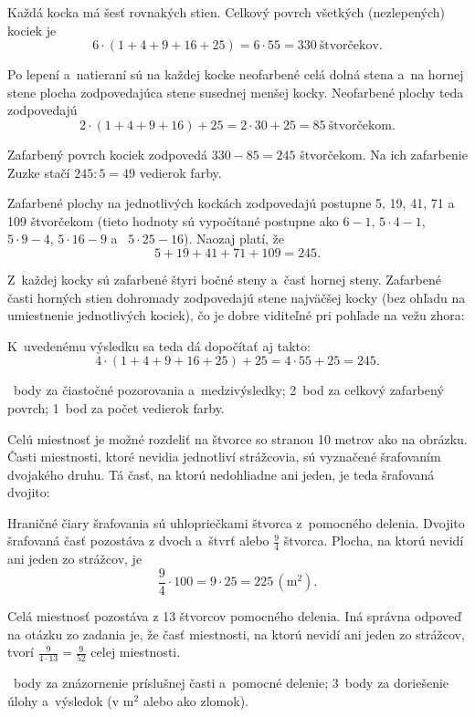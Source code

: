 {%
Každá kocka má šesť rovnakých stien.
Celkový povrch všetkých (nezlepených) kociek je
$$
6\cdot(1+4+9+16+25) =6\cdot55 = 330\ \text{štvorčekov}.
$$

Po lepení a~natieraní sú na každej kocke neofarbené celá dolná stena a~na hornej stene plocha zodpovedajúca stene susednej menšej kocky.
Neofarbené plochy teda zodpovedajú
$$
2\cdot(1+4+9+16)+25 =2\cdot30+25 = 85\ \text{štvorčekom}.
$$

Zafarbený povrch kociek zodpovedá $330-85=245$ štvorčekom.
Na ich zafarbenie Zuzke stačí $245:5=49$ vedierok farby.

\poznamky
Zafarbené plochy na jednotlivých kockách zodpovedajú postupne
5, 19, 41, 71 a ~ 109 štvorčekom
(tieto hodnoty sú vypočítané postupne ako $6-1$, $5\cdot4-1$, $5\cdot9-4$, $5\cdot16-9$ a ~$5\cdot25-16$).
Naozaj platí, že
$$
5+19+41+71+109=245 .
$$

Z~každej kocky sú zafarbené štyri bočné steny a~časť hornej steny.
Zafarbené časti horných stien dohromady zodpovedajú stene najväčšej kocky (bez ohľadu na umiestnenie jednotlivých kociek), čo je dobre viditeľné pri pohľade na vežu zhora:
%

\noindent
K~uvedenému výsledku sa teda dá dopočítať aj takto:
$$
4\cdot(1+4+9+16+25)+25 =4\cdot55+25 = 245 .
$$

~body za čiastočné pozorovania a~medzivýsledky;
2~bod za celkový zafarbený povrch;
1~bod za počet vedierok farby.
\endhodnotenie
}

{%
Celú miestnosť je možné rozdeliť na štvorce so stranou 10 metrov ako na obrázku.
Časti miestnosti, ktoré nevidia jednotliví strážcovia, sú vyznačené šrafovaním dvojakého druhu.
Tá časť, na ktorú nedohliadne ani jeden, je teda šrafovaná dvojito:
%

Hraničné čiary šrafovania sú uhlopriečkami štvorca z~pomocného delenia.
Dvojito šrafovaná časť pozostáva z dvoch a~štvrť alebo $\frac94$ štvorca.
Plocha, na ktorú nevidí ani jeden zo strážcov, je
$$
\frac94\cdot100 =9\cdot25 =225\,(\text{m}^2).
$$

\poznamka
Celá miestnosť pozostáva z 13 štvorcov pomocného delenia.
Iná správna odpoveď na otázku zo zadania je, že
časť miestnosti, na ktorú nevidí ani jeden zo strážcov, tvorí
$
\frac{9}{4\cdot13} = \frac{9}{52}
$
celej miestnosti.

~body za znázornenie príslušnej časti a~pomocné delenie;
3~body za doriešenie úlohy a~výsledok (v m$^2$ alebo ako zlomok).
\endhodnotenie
}

